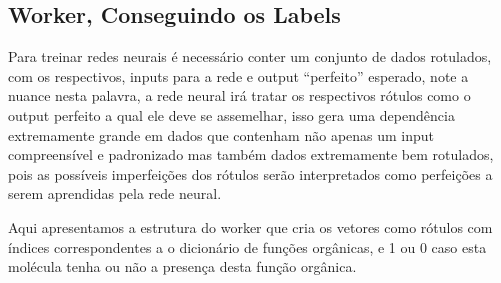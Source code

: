 \documentclass[11pt,a4paper]{article}
\begin{document}
\subsection{Worker, Conseguindo os Labels}

Para treinar redes neurais é necessário conter um conjunto de dados rotulados, com os respectivos, inputs para a rede e output “perfeito” esperado, note a nuance nesta palavra, a rede neural irá tratar os respectivos rótulos como o output perfeito a qual ele deve se assemelhar, isso gera uma dependência extremamente grande em dados que contenham não apenas um input compreensível e padronizado mas também dados extremamente bem rotulados, pois as possíveis imperfeições dos rótulos serão interpretados como perfeições a serem aprendidas pela rede neural.

Aqui apresentamos a estrutura do worker que cria os vetores como rótulos com índices correspondentes a o dicionário de funções orgânicas, e 1 ou 0 caso esta molécula tenha ou não a presença desta função orgânica.
\end{document}
